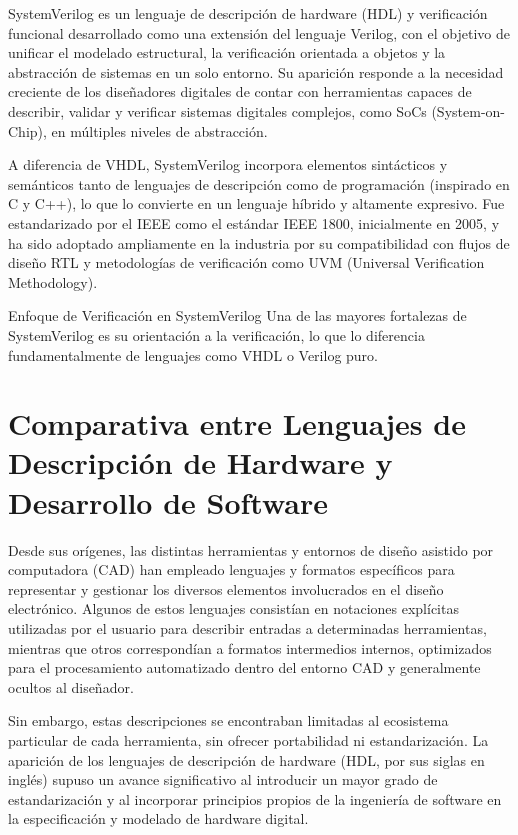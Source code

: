SystemVerilog es un lenguaje de descripción de hardware (HDL) y verificación funcional desarrollado como una extensión del lenguaje Verilog, con el objetivo de unificar el modelado estructural, la verificación orientada a objetos y la abstracción de sistemas en un solo entorno. Su aparición responde a la necesidad creciente de los diseñadores digitales de contar con herramientas capaces de describir, validar y verificar sistemas digitales complejos, como SoCs (System-on-Chip), en múltiples niveles de abstracción.

A diferencia de VHDL, SystemVerilog incorpora elementos sintácticos y semánticos tanto de lenguajes de descripción como de programación (inspirado en C y C++), lo que lo convierte en un lenguaje híbrido y altamente expresivo. Fue estandarizado por el IEEE como el estándar IEEE 1800, inicialmente en 2005, y ha sido adoptado ampliamente en la industria por su compatibilidad con flujos de diseño RTL y metodologías de verificación como UVM (Universal Verification Methodology).

Enfoque de Verificación en SystemVerilog
Una de las mayores fortalezas de SystemVerilog es su orientación a la verificación, lo que lo diferencia fundamentalmente de lenguajes como VHDL o Verilog puro. 

\section{Comparativa entre Lenguajes de Descripción de Hardware y Desarrollo de Software}
Desde sus orígenes, las distintas herramientas y entornos de diseño asistido por computadora (CAD) han empleado lenguajes y formatos específicos para representar y gestionar los diversos elementos involucrados en el diseño electrónico. Algunos de estos lenguajes consistían en notaciones explícitas utilizadas por el usuario para describir entradas a determinadas herramientas, mientras que otros correspondían a formatos intermedios internos, optimizados para el procesamiento automatizado dentro del entorno CAD y generalmente ocultos al diseñador.

Sin embargo, estas descripciones se encontraban limitadas al ecosistema particular de cada herramienta, sin ofrecer portabilidad ni estandarización. La aparición de los lenguajes de descripción de hardware (HDL, por sus siglas en inglés) supuso un avance significativo al introducir un mayor grado de estandarización y al incorporar principios propios de la ingeniería de software en la especificación y modelado de hardware digital.

